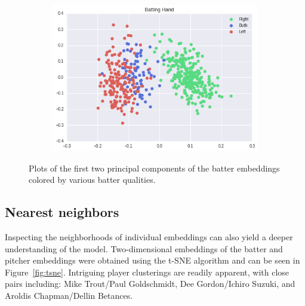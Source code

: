 \documentclass{article}
\begin{document}
\begin{figure}[h]
    \begin{subfigure}{0.5\linewidth}
    \centering
    \includegraphics[width=1\linewidth]{batter_hand.png}
    \caption{}
    \end{subfigure}
\caption{Plots of the first two principal components of the batter embeddings colored by various batter qualities.}
\label{fig:batter_traits}
\end{figure}

\subsection{Nearest neighbors}

Inspecting the neighborhoods of individual embeddings can also yield a deeper understanding of the model. Two-dimensional embeddings of the batter and pitcher embeddings were obtained using the t-SNE algorithm \parencite{VanderMaaten2008} and can be seen in Figure~\ref{fig:tsne}. Intriguing player clusterings are readily apparent, with close pairs including: Mike Trout/Paul Goldschmidt, Dee Gordon/Ichiro Suzuki, and Aroldis Chapman/Dellin Betances.
\end{document}
